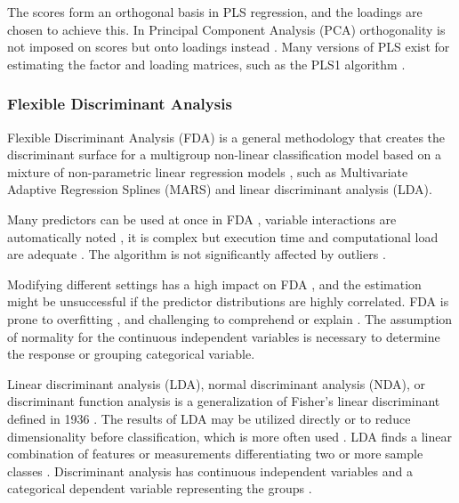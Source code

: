 \documentclass[sn-mathphys-num]{sn-jnl}%
\begin{document}
The scores form an orthogonal basis in PLS regression, and the loadings are chosen to achieve this. In Principal Component Analysis (PCA) orthogonality is not imposed on scores but onto loadings instead \cite{lindgren1993kernel, de1994comments, dayal1997improved, de1993simpls, rannar1994pls, abdi2010partial}. Many versions of PLS exist for estimating the factor and loading matrices, such as the PLS1 algorithm \cite{takane2016pls, hoskuldsson1988pls}. 

\subsubsection{Flexible Discriminant Analysis}

Flexible Discriminant Analysis (FDA) is a general methodology that creates the discriminant surface for a multigroup non-linear classification model based on a mixture of non-parametric linear regression models \cite{hastie1995penalized}, such as Multivariate Adaptive Regression Splines (MARS) and linear discriminant analysis (LDA).

Many predictors can be used at once in FDA \cite{HastieTibshirani2009}, variable interactions are automatically noted \cite{hastie1994flexible}, it is complex but execution time and computational load are adequate \cite{reynes2006choice}. The algorithm is not significantly affected by outliers \cite{phillips2017applying}.

Modifying different settings has a high impact on FDA \cite{hallgren2019species}, and the estimation might be unsuccessful if the predictor distributions are highly correlated. FDA is prone to overfitting \cite{thuiller2016ensemble}, and challenging to comprehend or explain \cite{quillfeldt2017influence}. The assumption of normality for the continuous independent variables is necessary \cite{zhang2019using} to determine the response or grouping categorical variable. 

Linear discriminant analysis (LDA), normal discriminant analysis (NDA), or discriminant function analysis is a generalization of Fisher's linear discriminant defined in 1936 \cite{cohen2013applied}. The results of LDA may be utilized directly or to reduce dimensionality before classification, which is more often used \cite{hansen2005using}. LDA finds a linear combination of features or measurements differentiating two or more sample classes \cite{fisher1936use, mclachlan2005discriminant}. Discriminant analysis has continuous independent variables and a categorical dependent variable representing the groups \cite{wetcher2011analyzing}.
\end{document}
